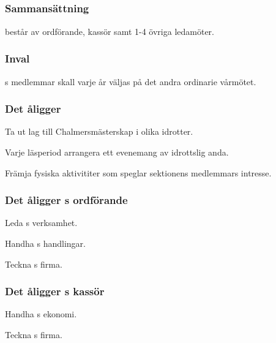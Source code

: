 \subsection{\FRITIDFULL}
\subsubsection{Sammansättning}
\FRITID{} består av ordförande, kassör samt 1-4 övriga ledamöter.

\subsubsection{Inval}
\FRITID{}s medlemmar skall varje år väljas på det andra ordinarie vårmötet.

\subsubsection{Det åligger \FRITID}
\begin{att}
	\item Ta ut lag till Chalmersmästerskap i olika idrotter.
	\item Varje läsperiod arrangera ett evenemang av idrottslig anda.
	\item Främja fysiska aktivititer som speglar sektionens medlemmars intresse.
\end{att}

\subsubsection{Det åligger \FRITID{}s ordförande}
\begin{att}
	\item Leda \FRITID{}s verksamhet.
	\item Handha \FRITID{}s handlingar.
	\item Teckna \FRITID{}s firma.
\end{att}

\subsubsection{Det åligger \FRITID{}s kassör}
\begin{att}
	\item Handha \FRITID{}s ekonomi.
	\item Teckna \FRITID{}s firma.
\end{att}